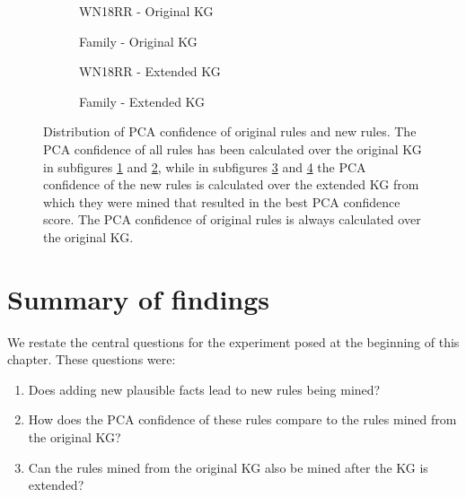 \begin{figure}[htbp]
\centering
\begin{subfigure}{.5\textwidth}
  \centering
    
    \caption{WN18RR - Original KG}
  \label{fig:PCA_rule_dist_new_original_wn18rr_sub}
\end{subfigure}%
\begin{subfigure}{.5\textwidth}
  \centering
    
    \caption{Family - Original KG}
  \label{fig:PCA_rule_dist_new_original_family_sub}
\end{subfigure}
\begin{subfigure}{.5\textwidth}
  \centering
    
    \caption{WN18RR - Extended KG}
  \label{fig:_PCA_rule_dist_new_original_wn18rr_sub}
\end{subfigure}%
\begin{subfigure}{.5\textwidth}
  \centering
    
    \caption{Family - Extended KG}
  \label{fig:_PCA_rule_dist_new_original_family_sub}
\end{subfigure}
\caption[PCA conf. dist. of new and original rules.]{Distribution of PCA confidence of original rules and new rules. The PCA confidence of all rules has been calculated over the original KG in subfigures \ref{fig:PCA_rule_dist_new_original_wn18rr_sub} and \ref{fig:PCA_rule_dist_new_original_family_sub}, while in subfigures \ref{fig:_PCA_rule_dist_new_original_wn18rr_sub} and \ref{fig:_PCA_rule_dist_new_original_family_sub} the PCA confidence of the new rules is calculated over the extended KG from which they were mined that resulted in the best PCA confidence score. The PCA confidence of original rules is always calculated over the original KG.}
\label{fig:PCA_rule_dist_new_original}
\end{figure}


\section{Summary of findings}
\label{results_summary}
We restate the central questions for the experiment posed at the beginning of this chapter. These questions were:
\begin{enumerate}
    \item Does adding new plausible facts lead to new rules being mined? 
    \item How does the PCA confidence of these rules compare to the rules mined from the original KG?
    \item Can the rules mined from the original KG also be mined after the KG is extended?
\end{enumerate}

